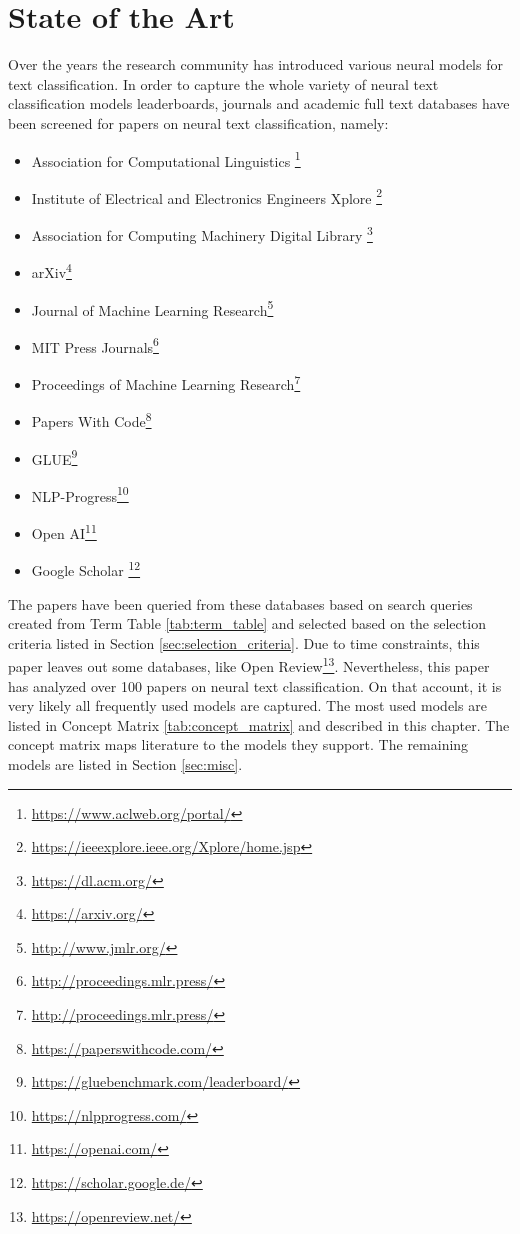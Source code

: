 \chapter{State of the Art}
\label{ch:sota}
	Over the years the research community has introduced various neural models for text classification.\autocites{Yang.2016}{Cho.2014}{Lee.2016}{Hochreiter.1997}{Kant.2018}{Zhou.2016}{Wang.2016}{Liang.2019}{Kim.2014}{Gao.2018}{Zhang.2015}{Johnson.2017}{Hoa.2017}{Yang.2018}{Rezaeinia.2018}{Zhao.2018}{Lai.2015}{Zheng.2019}{Johnson.2016}{Vaswani.2017}{Wang.2018b}{Iyyer.2015} In order to capture the whole variety of neural text classification models leaderboards, journals and academic full text databases have been screened for papers on neural text classification, namely:
	\begin{itemize}
		\item Association for Computational Linguistics \footnote{\url{https://www.aclweb.org/portal/}}
		\item Institute of Electrical and Electronics Engineers Xplore \footnote{\url{https://ieeexplore.ieee.org/Xplore/home.jsp}}
		\item Association for Computing Machinery Digital Library \footnote{\url{https://dl.acm.org/}}
		\item arXiv\footnote{\url{https://arxiv.org/}}
		\item Journal of Machine Learning Research\footnote{\url{http://www.jmlr.org/}}
		\item MIT Press Journals\footnote{\url{http://proceedings.mlr.press/}}
		\item Proceedings of Machine Learning Research\footnote{\url{http://proceedings.mlr.press/}}
		\item Papers With Code\footnote{\url{https://paperswithcode.com/}}
		\item GLUE\footnote{\url{https://gluebenchmark.com/leaderboard/}}
		\item NLP-Progress\footnote{\url{https://nlpprogress.com/}}
		\item Open AI\footnote{\url{https://openai.com/}}
		\item Google Scholar \footnote{\url{https://scholar.google.de/}}
	\end{itemize}
	The papers have been queried from these databases based on search queries created from Term Table \ref{tab:term_table} and selected based on the selection criteria listed in Section \ref{sec:selection_criteria}. Due to time constraints, this paper leaves out some databases, like Open Review\footnote{\url{https://openreview.net/}}. Nevertheless, this paper has analyzed over 100 papers on neural text classification. On that account, it is very likely all frequently used models are captured. The most used models are listed in Concept Matrix \ref{tab:concept_matrix} and described in this chapter. The concept matrix maps literature to the models they support. The remaining models are listed in Section \ref{sec:misc}.

